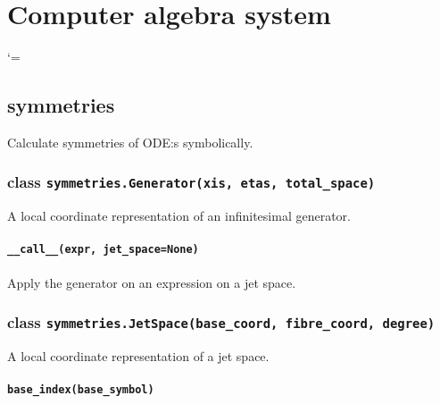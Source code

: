 \chapter{Computer algebra system} \label{app:computer-algebra}

\makeatletter
  \let\orig@item\item

  \def\item{%
      \@ifnextchar{[}%
          {\lstinline@item}%
          {\orig@item}%
  }

  \begingroup
  \catcode`\]=\active
  \gdef\lstinline@item[{%
      \setbox0\hbox\bgroup
          \catcode`\]=\active
          \let]\lstinline@item@end
  }
  \endgroup

  \def\lstinline@item@end{%
      \egroup
      \orig@item[\usebox0]%
  }
\makeatother

\section*{symmetries}

Calculate symmetries of ODE:s symbolically.

\subsection*{class \lstinline{symmetries.Generator(xis, etas, total_space)}}

   A local coordinate representation of an infinitesimal generator.

   \subsubsection*{\lstinline{__call__(expr, jet_space=None)}}

      Apply the generator on an expression on a jet space.

\subsection*{class \lstinline{symmetries.JetSpace(base_coord, fibre_coord, degree)}}

   A local coordinate representation of a jet space.

   \subsubsection*{\lstinline{base_index(base_symbol)}}

